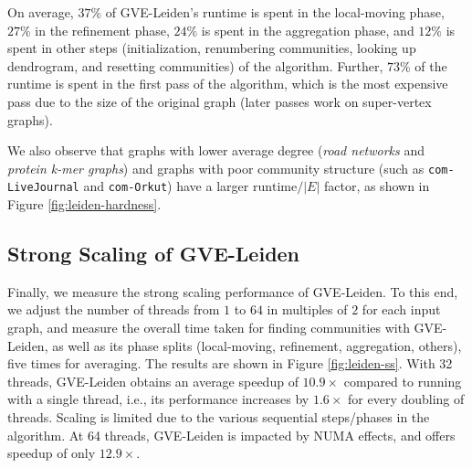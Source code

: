 On average, $37\%$ of GVE-Leiden's runtime is spent in the local-moving phase, $27\%$ in the refinement phase, $24\%$ is spent in the aggregation phase, and $12\%$ is spent in other steps (initialization, renumbering communities, looking up dendrogram, and resetting communities) of the algorithm. Further, $73\%$ of the runtime is spent in the first pass of the algorithm, which is the most expensive pass due to the size of the original graph (later passes work on super-vertex graphs).

We also observe that graphs with lower average degree (\textit{road networks} and \textit{protein k-mer graphs}) and graphs with poor community structure (such as \verb|com-LiveJournal| and \verb|com-Orkut|) have a larger $\text{runtime}/|E|$ factor, as shown in Figure \ref{fig:leiden-hardness}.




\subsection{Strong Scaling of GVE-Leiden}

Finally, we measure the strong scaling performance of GVE-Leiden. To this end, we adjust the number of threads from $1$ to $64$ in multiples of $2$ for each input graph, and measure the overall time taken for finding communities with GVE-Leiden, as well as its phase splits (local-moving, refinement, aggregation, others), five times for averaging. The results are shown in Figure \ref{fig:leiden-ss}. With 32 threads, GVE-Leiden obtains an average speedup of $10.9\times$ compared to running with a single thread, i.e., its performance increases by $1.6\times$ for every doubling of threads. Scaling is limited due to the various sequential steps/phases in the algorithm. At 64 threads, GVE-Leiden is impacted by NUMA effects, and offers speedup of only $12.9\times$.
